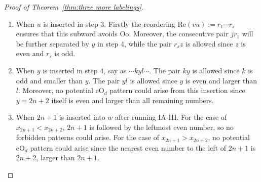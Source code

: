 \documentclass[11pt,reqno]{amsart}
\numberwithin{equation}{section}
\theoremstyle{plain}
\theoremstyle{definition}
\def\eO{\mathrm{eO}}
\def\Oo{\mathrm{Oo}}
\def\Re{\mathrm{Re}}
\begin{document}
\begin{proof}[Proof of Theorem~\ref{thm:three more labelings}]
\begin{itemize}
\begin{enumerate}
    		\item When $u$ is inserted in step 3. Firstly the reordering $\Re(vu):=r_1\cdots r_s$ ensures that this subword avoids $\Oo$. Moreover, the consecutive pair $jr_1$ will be further separated by $y$ in step 4, while the pair $r_sz$ is allowed since $z$ is even and $r_s$ is odd.
    		
    		\item When $y$ is inserted in step 4, say as $\cdots kyl\cdots$. The pair $ky$ is allowed since $k$ is odd and smaller than $y$. The pair $yl$ is allowed since $y$ is even and larger than $l$. Moreover, no potential $\eO_d$ pattern could arise from this insertion since $y=2n+2$ itself is even and larger than all remaining numbers. 

    		\item When $2n+1$ is inserted into $w$ after running IA-III. For the case of $x_{2n+1}<x_{2n+2}$, $2n+1$ is followed by the leftmost even number, so no forbidden patterns could arise. For the case of $x_{2n+1}>x_{2n+2}$, no potential $\eO_d$ pattern could arise since the nearest even number to the left of $2n+1$ is $2n+2$, larger than $2n+1$.
    	\end{enumerate}
    	

\end{itemize}
\end{proof}
\end{document}
